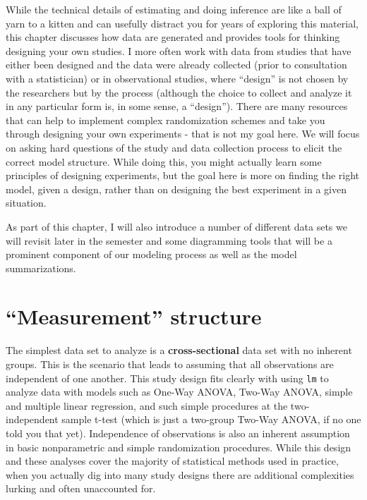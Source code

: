 \documentclass[
]{book}
\begin{document}
While the technical details of estimating and doing inference are like a ball of yarn to a kitten and can usefully distract you for years of exploring this material, this chapter discusses how data are generated and provides tools for thinking designing your own studies. I more often work with data from studies that have either been designed and the data were already collected (prior to consultation with a statistician) or in observational studies, where ``design'' is not chosen by the researchers but by the process (although the choice to collect and analyze it in any particular form is, in some sense, a ``design''). There are many resources that can help to implement complex randomization schemes and take you through designing your own experiments - that is not my goal here. We will focus on asking hard questions of the study and data collection process to elicit the correct model structure. While doing this, you might actually learn some principles of designing experiments, but the goal here is more on finding the right model, given a design, rather than on designing the best experiment in a given situation.

As part of this chapter, I will also introduce a number of different data sets we will revisit later in the semester and some diagramming tools that will be a prominent component of our modeling process as well as the model summarizations.

\hypertarget{section3-1}{%
\section{``Measurement'' structure}\label{section3-1}}

\indent The simplest data set to analyze is a \textbf{cross-sectional} data set with no inherent groups. This is the scenario that leads to assuming that all observations are independent of one another. This study design fits clearly with using \texttt{lm} to analyze data with models such as One-Way ANOVA, Two-Way ANOVA, simple and multiple linear regression, and such simple procedures at the two-independent sample t-test (which is just a two-group Two-Way ANOVA, if no one told you that yet). Independence of observations is also an inherent assumption in basic nonparametric and simple randomization procedures. While this design and these analyses cover the majority of statistical methods used in practice, when you actually dig into many study designs there are additional complexities lurking and often unaccounted for.
\end{document}
